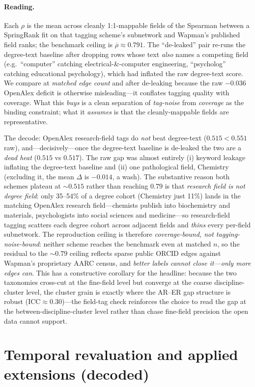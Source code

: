 \documentclass[11pt]{article}
\begin{document}
\paragraph{Reading.} Each $\rho$ is the mean across cleanly 1:1-mappable fields of the Spearman between a SpringRank fit on that tagging scheme's subnetwork and Wapman's published field ranks; the benchmark ceiling is $\overline{\rho}\approx0.791$. The ``de-leaked'' pair re-runs the degree-text baseline after dropping rows whose text \emph{also} names a competing field (e.g.\ ``computer'' catching electrical-\&-computer engineering, ``psycholog'' catching educational psychology), which had inflated the raw degree-text score. We compare at \emph{matched edge count} and after de-leaking because the raw $-0.036$ OpenAlex deficit is otherwise misleading---it conflates tagging quality with coverage. What this \emph{buys} is a clean separation of \emph{tag-noise} from \emph{coverage} as the binding constraint; what it \emph{assumes} is that the cleanly-mappable fields are representative.

The decode: OpenAlex research-field tags do \emph{not} beat degree-text ($0.515<0.551$ raw), and---decisively---once the degree-text baseline is de-leaked the two are a \emph{dead heat} ($0.515$ vs $0.517$). The raw gap was almost entirely (i) keyword leakage inflating the degree-text baseline and (ii) one pathological field, Chemistry (excluding it, the mean $\Delta$ is $-0.014$, a wash). The substantive reason both schemes plateau at $\sim0.515$ rather than reaching $0.79$ is that \emph{research field is not degree field}: only 35--54\% of a degree cohort (Chemistry just 11\%) lands in the matching OpenAlex research field---chemists publish into biochemistry and materials, psychologists into social sciences and medicine---so research-field tagging scatters each degree cohort across adjacent fields and \emph{thins} every per-field subnetwork. The reproduction ceiling is therefore \emph{coverage-bound, not tagging-noise-bound}: neither scheme reaches the benchmark even at matched $n$, so the residual to the $\sim0.79$ ceiling reflects sparse public ORCID edges against Wapman's proprietary AARC census, and \emph{better labels cannot close it---only more edges can}. This has a constructive corollary for the headline: because the two taxonomies cross-cut at the fine-field level but converge at the coarse discipline-cluster level, the cluster grain is exactly where the AR--ER gap structure is robust (ICC$\approx0.30$)---the field-tag check reinforces the choice to read the gap at the between-discipline-cluster level rather than chase fine-field precision the open data cannot support.\section{Temporal revaluation and applied extensions (decoded)}\label{sec:temporal-applied}
\end{document}
